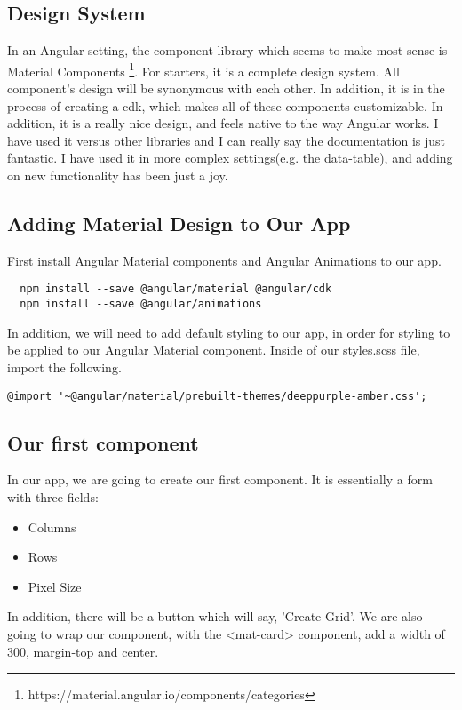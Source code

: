 \subsection{ Design System }
In an Angular setting, the component library which seems to make most sense is
Material Components
\footnote{https://material.angular.io/components/categories}. For starters, it
is a complete design system. All component's design will be synonymous with
each other. In addition, it is in the process of creating a cdk, which makes
all of these components customizable. In addition, it is a really nice design,
and feels native to the way Angular works. I have used it versus other libraries
and I can really say the documentation is just fantastic. I have used it in more
complex settings(e.g. the data-table), and adding on new functionality has been
just a joy.

\subsection{ Adding Material Design to Our App }
First install Angular Material components and Angular Animations to our app.
\begin{verbatim}
  npm install --save @angular/material @angular/cdk
  npm install --save @angular/animations
\end{verbatim}

In addition, we will need to add default styling to our app, in order for
styling to be applied to our Angular Material component. Inside of our
styles.scss file, import the following.
\begin{lstlisting}
@import '~@angular/material/prebuilt-themes/deeppurple-amber.css';
\end{lstlisting}

\subsection{ Our first component }
In our app, we are going to create our first component. It is essentially a form
with three fields:
\begin{itemize}
  \item Columns
  \item Rows
  \item Pixel Size
\end{itemize}

In addition, there will be a button which will say, 'Create Grid'. We are also
going to wrap our component, with the <mat-card> component, add a width of
300, margin-top and center.

